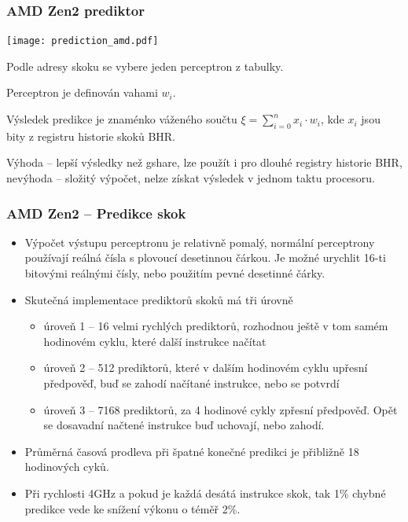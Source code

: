 \documentclass{beamer}
\begin{document}
\begin{frame}
\frametitle{AMD Zen2 prediktor}

\begin{center}
\texttt{[image: prediction\_amd.pdf]}
\end{center}

Podle adresy skoku se vybere jeden perceptron z tabulky. 

Perceptron je definován vahami $w_i$. 

Výsledek predikce je znaménko váženého součtu $\xi = \sum_{i=0}^{n} x_i \cdot w_i$, kde $x_i$ jsou bity z registru historie skoků BHR.

Výhoda -- lepší výsledky než gshare, lze použít i pro dlouhé registry historie BHR, nevýhoda -- složitý výpočet, nelze získat výsledek v jednom taktu procesoru.
\end{frame}

\begin{frame}
\frametitle{AMD Zen2 -- Predikce skok}

\begin{itemize}
\item Výpočet výstupu perceptronu je relativně pomalý, normální perceptrony používají reálná čísla s plovoucí desetinnou čárkou. Je možné urychlit 16-ti bitovými reálnými čísly, nebo použitím pevné desetinné čárky.
\item Skutečná implementace prediktorů skoků má tři úrovně
\begin{itemize}
\item úroveň 1 -- 16 velmi rychlých prediktorů, rozhodnou ještě v tom samém hodinovém cyklu, které další instrukce načítat
\item úroveň 2 -- 512 prediktorů, které v dalším hodinovém cyklu upřesní předpověď, buď se zahodí načítané instrukce, nebo se potvrdí
\item úroveň 3 -- 7168 prediktorů, za 4 hodinové cykly zpřesní předpověď. Opět se dosavadní načtené instrukce buď uchovají, nebo zahodí.
\end{itemize}
\item Průměrná časová prodleva při špatné konečné predikci je přibližně 18 hodinových cyků.
\item Při rychlosti 4GHz a pokud je každá desátá instrukce skok, tak 1\% chybné predikce vede ke snížení výkonu o téměř 2\%.
\end{itemize}
\end{frame}
\end{document}
